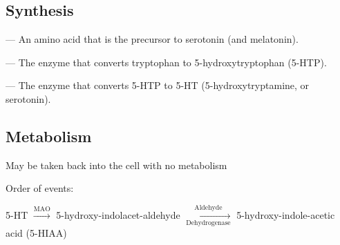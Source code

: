 \subsection{Synthesis}

\begin{coloredlist}
    \item {} — An amino acid that is the precursor to serotonin (and melatonin).
    \begin{coloredlist}
        \item {} — The enzyme that converts tryptophan to 5-hydroxytryptophan (5-HTP).
        \item {} — The enzyme that converts 5-HTP to 5-HT (5-hydroxytryptamine, or serotonin).
    \end{coloredlist}
\end{coloredlist}

\subsection{Metabolism}

\begin{coloredlist}
    \item May be taken back into the cell with no metabolism
    \item Order of events:
    \begin{coloredlist}
        \item 5-HT \(\xrightarrow{\text{MAO}}\) 5-hydroxy-indolacet-aldehyde \(\xrightarrow[\text{Dehydrogenase}]{\text{Aldehyde}}\) 5-hydroxy-indole-acetic acid (5-HIAA)
        \item 
    \end{coloredlist}
\end{coloredlist}
